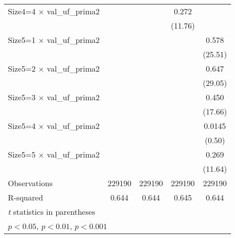 {\begin{tabular}{l*{4}{c}}
Size4=4 $\times$ val\_uf\_prima2&                     &                     &       0.272\sym{***}&                     \\
                    &                     &                     &     (11.76)         &                     \\
Size5=1 $\times$ val\_uf\_prima2&                     &                     &                     &       0.578\sym{***}\\
                    &                     &                     &                     &     (25.51)         \\
Size5=2 $\times$ val\_uf\_prima2&                     &                     &                     &       0.647\sym{***}\\
                    &                     &                     &                     &     (29.05)         \\
Size5=3 $\times$ val\_uf\_prima2&                     &                     &                     &       0.450\sym{***}\\
                    &                     &                     &                     &     (17.66)         \\
Size5=4 $\times$ val\_uf\_prima2&                     &                     &                     &      0.0145         \\
                    &                     &                     &                     &      (0.50)         \\
Size5=5 $\times$ val\_uf\_prima2&                     &                     &                     &       0.269\sym{***}\\
                    &                     &                     &                     &     (11.64)         \\
\hline
Observations        &      229190         &      229190         &      229190         &      229190         \\
R-squared           &       0.644         &       0.644         &       0.645         &       0.644         \\
\hline\hline
\multicolumn{5}{l}{\footnotesize \textit{t} statistics in parentheses}\\
\multicolumn{5}{l}{\footnotesize \sym{*} \(p<0.05\), \sym{**} \(p<0.01\), \sym{***} \(p<0.001\)}\\
\end{tabular}
}
